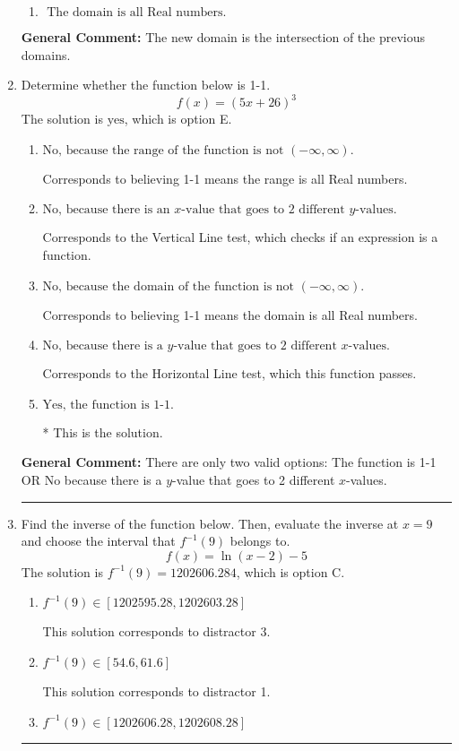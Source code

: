 \documentclass{extbook}[14pt]
\newcommand{\litem}[1]{\item #1

\rule{\textwidth}{0.4pt}}
\begin{document}
\begin{enumerate}
{\begin{enumerate}[label=\Alph*.]
\item \( \text{ The domain is all Real numbers. } \)


\end{enumerate}

\textbf{General Comment:} The new domain is the intersection of the previous domains.
}
\litem{
Determine whether the function below is 1-1.
\[ f(x) = (5 x + 26)^3 \]The solution is \( \text{yes} \), which is option E.\begin{enumerate}[label=\Alph*.]
\item \( \text{No, because the range of the function is not $(-\infty, \infty)$.} \)

Corresponds to believing 1-1 means the range is all Real numbers.
\item \( \text{No, because there is an $x$-value that goes to 2 different $y$-values.} \)

Corresponds to the Vertical Line test, which checks if an expression is a function.
\item \( \text{No, because the domain of the function is not $(-\infty, \infty)$.} \)

Corresponds to believing 1-1 means the domain is all Real numbers.
\item \( \text{No, because there is a $y$-value that goes to 2 different $x$-values.} \)

Corresponds to the Horizontal Line test, which this function passes.
\item \( \text{Yes, the function is 1-1.} \)

* This is the solution.
\end{enumerate}

\textbf{General Comment:} There are only two valid options: The function is 1-1 OR No because there is a $y$-value that goes to 2 different $x$-values.
}
\litem{
Find the inverse of the function below. Then, evaluate the inverse at $x = 9$ and choose the interval that $f^{-1}(9)$ belongs to.
\[ f(x) = \ln{(x-2)}-5 \]The solution is \( f^{-1}(9) = 1202606.284 \), which is option C.\begin{enumerate}[label=\Alph*.]
\item \( f^{-1}(9) \in [1202595.28, 1202603.28] \)

 This solution corresponds to distractor 3.
\item \( f^{-1}(9) \in [54.6, 61.6] \)

 This solution corresponds to distractor 1.
\item \( f^{-1}(9) \in [1202606.28, 1202608.28] \)


\end{enumerate}}
\end{enumerate}
\end{document}
